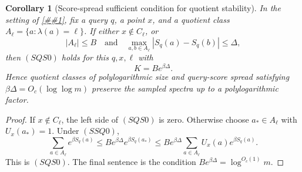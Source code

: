 \documentclass[10pt]{article}
\newcommand{\cref}[1]{\ref{##1}}
\newtheorem{corollary}[theorem]{Corollary}
\theoremstyle{definition}
\begin{document}
\begin{corollary}[Score-spread sufficient condition for quotient stability]
   \label{cor:score-spread-quotient-stability}
   In the setting of \cref{lem:stable-quotient-sampled-spectrum}, fix a query
   \(q\), a point \(x\), and a quotient class
   \(A_\ell=\{a:\lambda(a)=\ell\}\).  If either \(x\notin C_\ell\), or
   \[
      |A_\ell|\le B
      \quad\text{and}\quad
      \max_{a,b\in A_\ell}|S_q(a)-S_q(b)|\le\Delta,
      \tag{SSQ0}
   \]
   then \((SQS0)\) holds for this \(q,x,\ell\) with
   \[
      K=B e^{\beta\Delta}.
      \tag{SSQ1}
   \]
   Hence quotient classes of polylogarithmic size and query-score spread
   satisfying \(\beta\Delta=O_c(\log\log m)\) preserve the sampled spectra up
   to a polylogarithmic factor.
\end{corollary}

\begin{proof}
   If \(x\notin C_\ell\), the left side of \((SQS0)\) is zero.  Otherwise
   choose \(a_*\in A_\ell\) with \(U_x(a_*)=1\).  Under \((SSQ0)\),
   \[
      \sum_{a\in A_\ell}e^{\beta S_q(a)}
      \le
      B e^{\beta\Delta}e^{\beta S_q(a_*)}
      \le
      B e^{\beta\Delta}
      \sum_{a\in A_\ell}U_x(a)e^{\beta S_q(a)}.
   \]
   This is \((SQS0)\).  The final sentence is the condition
   \(B e^{\beta\Delta}=\log^{O_c(1)}m\).
\end{proof}
\end{document}

